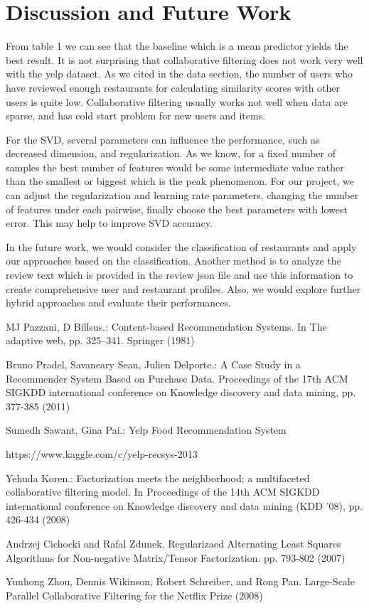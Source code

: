 \documentclass{llncs}
\begin{document}
\section{Discussion and Future Work}
From table 1 we can see that the baseline which is a mean predictor yields the best result. It is not surprising that collaborative filtering does not work very well with the yelp dataset. As we cited in the data section, the number of users who have reviewed enough restaurants for calculating similarity scores with other users is quite low. Collaborative filtering usually works not well when data are sparse, and has cold start problem for new users and items.

For the SVD, several parameters can influence the performance, such as decreased dimension, and regularization. As we know, for a fixed number of samples the best number of features would be some intermediate value rather than the smallest or biggest which is the peak phenomenon. For our project, we can adjust the regularization and learning rate parameters, changing the number of features under each pairwise, finally choose the best parameters with lowest error. This may help to improve SVD accuracy.
 
 In the future work, we would consider the classification of restaurants and apply our approaches based on the classification. Another method is to analyze the review text which is provided in the review json file and use this information to create comprehensive user and restaurant profiles. Also, we would explore further hybrid approaches and evaluate their performances.

%
%
\begin{thebibliography}{5}
%
MJ Pazzani, D Billsus.:
Content-based Recommendation Systems. In The adaptive web, pp. 325–341. Springer (1981) 

Bruno Pradel, Savaneary Sean, Julien Delporte.: 
A Case Study in a Recommender System Based on Purchase Data. Proceedings of the 17th ACM SIGKDD international conference on Knowledge discovery and data mining, pp. 377-385 (2011)

Sumedh Sawant, Gina Pai.:
Yelp Food Recommendation System

https://www.kaggle.com/c/yelp-recsys-2013

Yehuda Koren.: 
Factorization meets the neighborhood: a multifaceted collaborative filtering model. In Proceedings of the 14th ACM SIGKDD international conference on Knowledge discovery and data mining (KDD '08), pp. 426-434 (2008)

Andrzej Cichocki and Rafal Zdunek. Regularizaed Alternating Least Squares Algorithms for Non-negative Matrix/Tensor Factorization. pp. 793-802 (2007)

Yunhong Zhou, Dennis Wikinson, Robert Schreiber, and Rong Pan. Large-Scale Parallel Collaborative Filtering for the Netflix Prize (2008)


\end{thebibliography}
\end{document}
